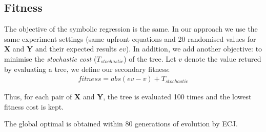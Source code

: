 \subsection{Fitness}
The objective of the symbolic regression is the same. In our approach we use the same experiment settings (same upfront equations and 20 randomised values for \textbf{X} and \textbf{Y} and their expected results $ev$). In addition, we add another objective: to minimise the \emph{stochastic cost} ($T_{stochastic}$) of the tree. Let $v$ denote the value retured by evaluating a tree, we define our secondary fitness:
\begin{align*}
fitness = abs(ev - v) + T_{stochastic}
\end{align*}

Thus, for each pair of \textbf{X} and \textbf{Y}, the tree is evaluated 100 times and the lowest fitness cost is kept.

The global optimal is obtained within 80 generations of evolution by ECJ. 

